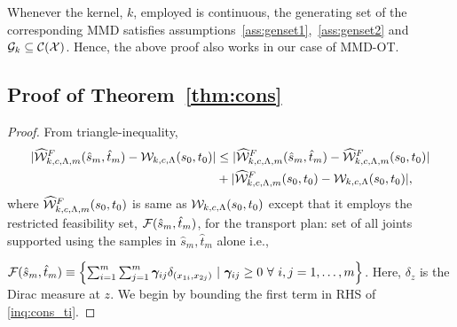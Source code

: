 \begin{remark}
Whenever the kernel, $k$, employed is continuous, the generating set of the corresponding MMD satisfies assumptions~\ref{ass:genset1},\ \ref{ass:genset2} and $\mathcal{G}_k\subseteq\mathcal{C}(\mathcal{X})$. Hence, the above proof also works in our case of MMD-OT.
\end{remark}


\subsection[Proof of Consistency of the Proposed Estimator]{Proof of Theorem~\ref{thm:cons}}\label{cons}
\uotcons*
\begin{proof} 

From triangle-inequality, 
\begin{align}\label{inq:cons_ti}
|\widehat{\mathcal{W}}^F_{k, c, \Lambda, m}(\hat{s}_m, \hat{t}_m)-\mathcal{W}_{k, c, \Lambda}(s_0, t_0)| & \leq |\widehat{\mathcal{W}}^F_{k, c, \Lambda, m}(\hat{s}_m, \hat{t}_m)-\widehat{\mathcal{W}}^F_{k, c, \Lambda, m}(s_0, t_0)|\nonumber\\
&+|\widehat{\mathcal{W}}^F_{k, c, \Lambda, m}(s_0, t_0)-\mathcal{W}_{k, c, \Lambda}(s_0, t_0)|,
\end{align}
where $\widehat{\mathcal{W}}^F_{k, c, \Lambda, m}(s_0, t_0)$ is same as $\mathcal{W}_{k, c, \Lambda}(s_0, t_0)$ except that it employs the restricted feasibility set, $\mathcal{F}(\hat{s}_m,\hat{t}_m)$, for the transport plan: set of all joints supported using the samples in $\hat{s}_m,\hat{t}_m$ alone i.e.,

$\calF(\hat{s}_m,\hat{t}_m)\equiv\left\{\sum_{i=1}^m\sum_{j=1}^m\bgamma_{ij}\delta_{(x_{1i},x_{2j})}\ |\ \bgamma_{ij}\ge0\ \forall\ i,j=1,\ldots,m\right\}$. Here, $\delta_z$ is the Dirac measure at $z$. We begin by bounding the first term in RHS of \ref{inq:cons_ti}.


\end{proof}
